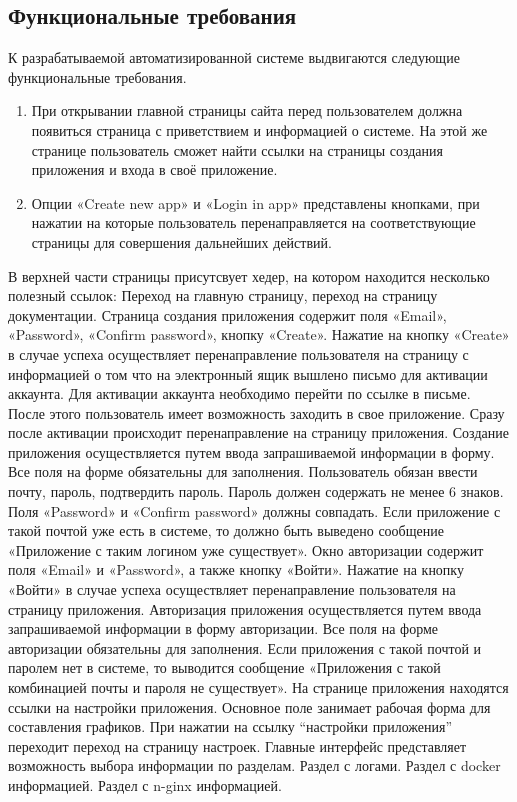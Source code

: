 \subsection{Функциональные требования}

К разрабатываемой автоматизированной системе выдвигаются следующие функциональные требования.
\begin{enumerate}
\item При открывании главной страницы сайта перед пользователем должна появиться страница с приветствием и информацией о системе. На этой же странице пользователь сможет найти ссылки на страницы создания приложения и входа в своё приложение.
\item Опции «Create new app» и «Login in app» представлены кнопками, при нажатии на которые пользователь перенаправляется на соответствующие страницы для совершения дальнейших действий.
\end{enumerate}
В верхней части страницы присутсвует хедер, на котором находится несколько полезный ссылок: Переход на главную страницу, переход на страницу документации.
Страница создания приложения содержит поля «Email», «Password», «Confirm password», кнопку «Create».
Нажатие на кнопку «Create» в случае успеха осуществляет перенаправление пользователя на страницу с информацией о том что на электронный ящик вышлено письмо для активации аккаунта.
Для активации аккаунта необходимо перейти по ссылке в письме. После этого пользователь имеет возможность заходить в свое приложение.
Сразу после активации происходит перенаправление на страницу приложения.
Создание приложения осуществляется путем ввода запрашиваемой информации в форму.
Все поля на форме обязательны для заполнения.
Пользователь обязан ввести почту, пароль, подтвердить пароль.
Пароль должен содержать не менее 6 знаков.
Поля «Password» и «Confirm password» должны совпадать.
Если приложение с такой почтой уже есть в системе, то должно быть выведено сообщение «Приложение с таким логином уже существует».
Окно авторизации содержит поля «Email» и «Password», а также кнопку «Войти».
Нажатие на кнопку «Войти» в случае успеха осуществляет перенаправление пользователя на страницу приложения.
Авторизация приложения осуществляется путем ввода запрашиваемой информации в форму авторизации.
Все поля на форме авторизации обязательны для заполнения.
Если приложения с такой почтой и паролем нет в системе, то выводится сообщение «Приложения с такой комбинацией почты и пароля не существует».
На странице приложения находятся ссылки на настройки приложения. Основное поле занимает рабочая форма для составления графиков.
При нажатии на ссылку “настройки приложения” переходит переход на страницу настроек.
Главные интерфейс представляет возможность выбора информации по разделам. 
Раздел с логами.
Раздел с docker информацией.
Раздел с n-ginx информацией.
